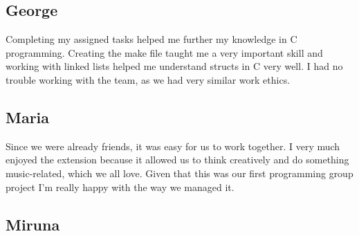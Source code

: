 \documentclass[11pt]{article}
\begin{document}
\subsection{George}
Completing my assigned tasks helped me further my knowledge in C programming. Creating the make file taught me a very important skill and working with linked lists helped me understand structs in C very well. I had no trouble working with the team, as we had very similar work ethics.

\subsection{Maria}
Since we were already friends, it was easy for us to work together. I very much enjoyed the extension because it allowed us to think creatively and do something music-related, which we all love. Given that this was our first programming group project I’m really happy with the way we managed it.
\subsection{Miruna}
\end{document}

